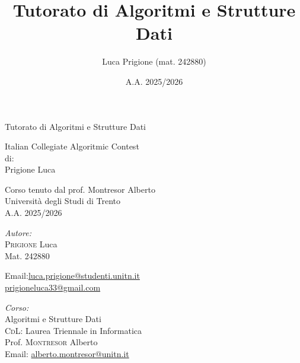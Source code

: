 \documentclass[a4paper,twoside]{report}
\title{Tutorato di Algoritmi e Strutture Dati}
\author{Luca Prigione (mat. 242880)}
\date{A.A. 2025/2026}
\begin{document}
    

    \begin{titlepage}
        \centering  %
        
        {\Huge\textbf\hfill{Tutorato di Algoritmi e Strutture Dati}\hfill} %
        \vspace{1.5cm}

        {\Large Italian Collegiate Algoritmic Contest} \\[1cm] %

        
        {\normalsize di: } \\[.3cm]
        {\Large Prigione Luca} \\ %
        \vspace{1.5cm}
        

        {\normalsize Corso tenuto dal prof. Montresor Alberto} \\[0.3cm] %
        {\large Università degli Studi di Trento} \\[1.5cm]
        
        {\large A.A. 2025/2026} \\[3cm] %
        
        \vfill
        \begin{minipage}[t]{0.4\textwidth}
            \begin{flushleft} \normalsize
                \emph{Autore:}\\
                \textsc{Prigione} Luca \\ %
                Mat. 242880 \\
                \vspace{-\baselineskip}
                \begin{tabbing}
                    Email:\= \href{mailto:luca.prigione@studenti.unitn.it}{luca.prigione@studenti.unitn.it} \\
                        \>  \href{mailto:prigioneluca33@gmail.com}{prigioneluca33@gmail.com}
                \end{tabbing}
            \end{flushleft}
        \end{minipage}%
        \hfill
        \begin{minipage}[t]{0.4\textwidth}
            \begin{flushleft} \normalsize
                \emph{Corso:}\\
                Algoritmi e Strutture Dati \\
                \textsc{CdL}: Laurea Triennale in Informatica \\
                Prof. \textsc{Montresor} Alberto \\
                Email: \href{mailto:alberto.montresor@unitn.it}{alberto.montresor@unitn.it}
            \end{flushleft}
        \end{minipage}
        \vfill
    \end{titlepage}
    
    
\end{document}
